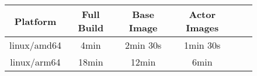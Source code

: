 \begin{figure}[t]
    \begin{changemargin}{0cm}{0cm}
        \centering
        \begin{tabular}{|c|c|c|c|c|c|}
            \hline
                \textbf{Platform} & \textbf{Full Build} & \textbf{Base Image} & \textbf{Actor Images} \\
            \hline
                linux/amd64 & 4min & 2min 30s & 1min 30s \\
            \hline
                linux/arm64 & 18min & 12min & 6min 
            \\
            \hline
        \end{tabular}
        \label{table:sklearn_mnist_multi_platform_build_example}
    \end{changemargin}
\end{figure}